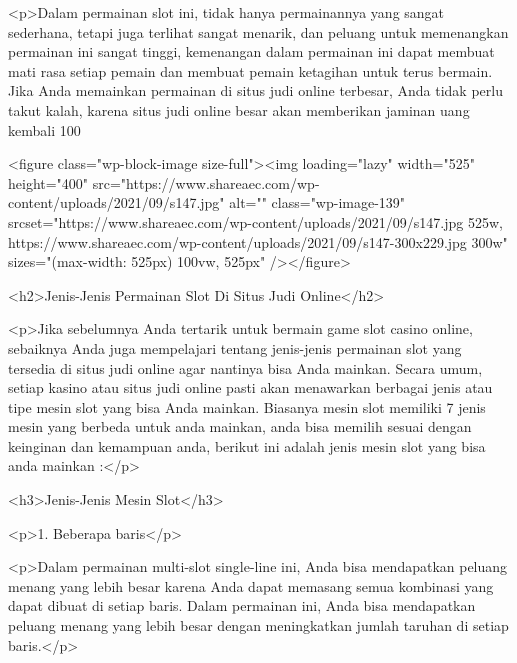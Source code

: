<p>Dalam permainan slot ini, tidak hanya permainannya yang sangat sederhana, tetapi juga terlihat sangat menarik, dan peluang untuk memenangkan permainan ini sangat tinggi, kemenangan dalam permainan ini dapat membuat mati rasa setiap pemain dan membuat pemain ketagihan untuk terus bermain. Jika Anda memainkan permainan di situs judi online terbesar, Anda tidak perlu takut kalah, karena situs judi online besar akan memberikan jaminan uang kembali 100%



<figure class="wp-block-image size-full"><img loading="lazy" width="525" height="400" src="https://www.shareaec.com/wp-content/uploads/2021/09/s147.jpg" alt="" class="wp-image-139" srcset="https://www.shareaec.com/wp-content/uploads/2021/09/s147.jpg 525w, https://www.shareaec.com/wp-content/uploads/2021/09/s147-300x229.jpg 300w" sizes="(max-width: 525px) 100vw, 525px" /></figure>



<h2>Jenis-Jenis Permainan Slot Di Situs Judi Online</h2>



<p>Jika sebelumnya Anda tertarik untuk bermain game slot casino online, sebaiknya Anda juga mempelajari tentang jenis-jenis permainan slot yang tersedia di situs judi online agar nantinya bisa Anda mainkan. Secara umum, setiap kasino atau situs judi online pasti akan menawarkan berbagai jenis atau tipe mesin slot yang bisa Anda mainkan. Biasanya mesin slot memiliki 7 jenis mesin yang berbeda untuk anda mainkan, anda bisa memilih sesuai dengan keinginan dan kemampuan anda, berikut ini adalah jenis mesin slot yang bisa anda mainkan :</p>



<h3>Jenis-Jenis Mesin Slot</h3>



<p>1. Beberapa baris</p>



<p>Dalam permainan multi-slot single-line ini, Anda bisa mendapatkan peluang menang yang lebih besar karena Anda dapat memasang semua kombinasi yang dapat dibuat di setiap baris. Dalam permainan ini, Anda bisa mendapatkan peluang menang yang lebih besar dengan meningkatkan jumlah taruhan di setiap baris.</p>



